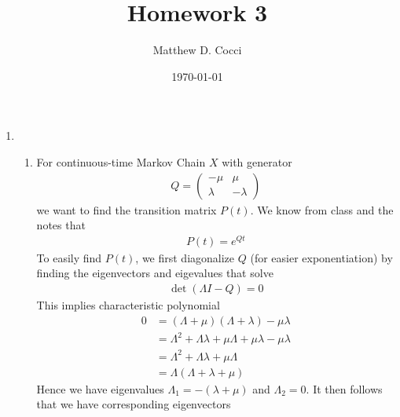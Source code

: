 \documentclass[12pt]{article}
\author{Matthew D. Cocci}
\title{Homework 3}
\date{\today}
\theoremstyle{plain}
\theoremstyle{definition}
\theoremstyle{remark}
\begin{document}
\maketitle


\begin{enumerate}
  \item
  \begin{enumerate}
    \item For continuous-time Markov Chain $X$ with generator
      \begin{align*}
        Q = \begin{pmatrix}
              -\mu & \mu \\
              \lambda & -\lambda
            \end{pmatrix}
      \end{align*}
      we want to find the transition matrix $P(t)$. We know from class
      and the notes that
      \begin{align*}
        P(t) = e^{Qt}
      \end{align*}
      To easily find $P(t)$, we first diagonalize $Q$ (for easier
      exponentiation) by finding the eigenvectors and eigevalues that
      solve
      \begin{align*}
        \det(\Lambda I - Q) = 0
      \end{align*}
      This implies characteristic polynomial
      \begin{align*}
        0 &= (\Lambda + \mu)(\Lambda+\lambda) - \mu\lambda\\
          &= \Lambda^2 + \Lambda\lambda + \mu\Lambda + \mu\lambda - \mu\lambda\\
          &= \Lambda^2 + \Lambda\lambda + \mu\Lambda \\ &= \Lambda( \Lambda + \lambda + \mu)
      \end{align*}
      Hence we have eigenvalues $\Lambda_1 = -(\lambda+\mu)$ and $\Lambda_2
      = 0$. It then follows that we have corresponding eigenvectors

\end{enumerate}
\end{enumerate}
\end{document}
